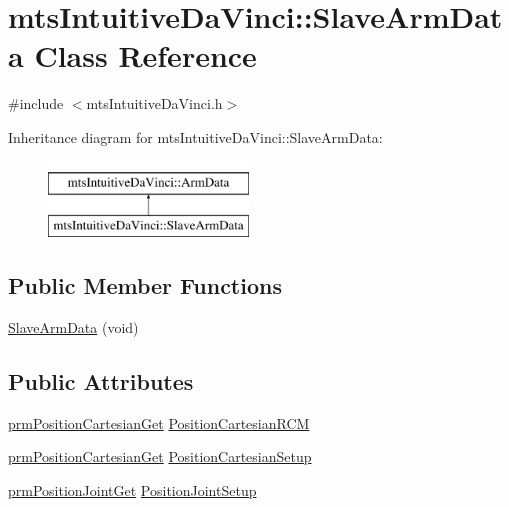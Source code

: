 \hypertarget{classmts_intuitive_da_vinci_1_1_slave_arm_data}{\section{mts\-Intuitive\-Da\-Vinci\-:\-:Slave\-Arm\-Data Class Reference}
\label{classmts_intuitive_da_vinci_1_1_slave_arm_data}
}


{\ttfamily \#include $<$mts\-Intuitive\-Da\-Vinci.\-h$>$}

Inheritance diagram for mts\-Intuitive\-Da\-Vinci\-:\-:Slave\-Arm\-Data\-:\begin{figure}[H]
\begin{center}
\leavevmode
\includegraphics[height=2.000000cm]{d9/d02/classmts_intuitive_da_vinci_1_1_slave_arm_data}
\end{center}
\end{figure}
\subsection*{Public Member Functions}
\begin{DoxyCompactItemize}
\item 
\hyperlink{classmts_intuitive_da_vinci_1_1_slave_arm_data_a33819da9e042703dd661c07807e3c297}{Slave\-Arm\-Data} (void)
\end{DoxyCompactItemize}
\subsection*{Public Attributes}
\begin{DoxyCompactItemize}
\item 
\hyperlink{classprm_position_cartesian_get}{prm\-Position\-Cartesian\-Get} \hyperlink{classmts_intuitive_da_vinci_1_1_slave_arm_data_acbcd39e3197437403efb86bf908adbd5}{Position\-Cartesian\-R\-C\-M}
\item 
\hyperlink{classprm_position_cartesian_get}{prm\-Position\-Cartesian\-Get} \hyperlink{classmts_intuitive_da_vinci_1_1_slave_arm_data_a09a328a245e9ccf2d482941fba0c76bc}{Position\-Cartesian\-Setup}
\item 
\hyperlink{classprm_position_joint_get}{prm\-Position\-Joint\-Get} \hyperlink{classmts_intuitive_da_vinci_1_1_slave_arm_data_a9510d583a4decfbd25c027bf7c1e3e15}{Position\-Joint\-Setup}
\end{DoxyCompactItemize}


